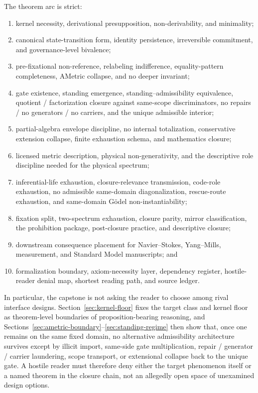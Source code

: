 The theorem arc is strict:
\begin{enumerate}
  \item kernel necessity, derivational presupposition, non-derivability, and minimality;
  \item canonical state-transition form, identity persistence, irreversible commitment, and governance-level bivalence;
  \item pre-fixational non-reference, relabeling indifference, equality-pattern completeness, AMetric collapse, and no deeper invariant;
  \item gate existence, standing emergence, standing--admissibility equivalence, quotient / factorization closure against same-scope discriminators, no repairs / no generators / no carriers, and the unique admissible interior;
  \item partial-algebra envelope discipline, no internal totalization, conservative extension collapse, finite exhaustion schema, and mathematics closure;
  \item licensed metric description, physical non-generativity, and the descriptive role discipline needed for the physical spectrum;
  \item inferential-life exhaustion, closure-relevance transmission, code-role exhaustion, no admissible same-domain diagonalization, rescue-route exhaustion, and same-domain G\"odel non-instantiability;
  \item fixation split, two-spectrum exhaustion, closure parity, mirror classification, the prohibition package, post-closure practice, and descriptive closure;
  \item downstream consequence placement for Navier--Stokes, Yang--Mills, measurement, and Standard Model manuscripts; and
  \item formalization boundary, axiom-necessity layer, dependency register, hostile-reader denial map, shortest reading path, and source ledger.
\end{enumerate}

In particular, the capstone is not asking the reader to choose among rival interface designs. Section~\ref{sec:kernel-floor} fixes the target class and kernel floor as theorem-level boundaries of proposition-bearing reasoning, and Sections~\ref{sec:ametric-boundary}--\ref{sec:standing-regime} then show that, once one remains on the same fixed domain, no alternative admissibility architecture survives except by illicit import, same-side gate multiplication, repair / generator / carrier laundering, scope transport, or extensional collapse back to the unique gate. A hostile reader must therefore deny either the target phenomenon itself or a named theorem in the closure chain, not an allegedly open space of unexamined design options.

